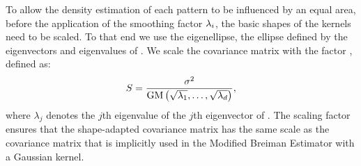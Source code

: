 	To allow the density estimation of each pattern to be influenced by an equal area, before the application of the smoothing factor $\lambda_{i}$, the basic shapes of the kernels need to be scaled. To that end we use the eigenellipse, the ellipse defined by the eigenvectors and eigenvalues of \varCovarianceFunction{\varNeighborhood{\varPattern}}. We scale the covariance matrix with the factor \varScalingFactor, defined as:
	\begin{equation}
		S = \frac{\sigma^2}{\text{GM}\left(\sqrt{\lambda_1}, \dotsc, \sqrt{\lambda_d}\right)},
	\end{equation}
	where $\lambda_j$ denotes the $j$th eigenvalue of the $j$th eigenvector of \varCovarianceMatrix. The scaling factor \varScalingFactor ensures that the shape-adapted covariance matrix has the same scale as the covariance matrix that is implicitly used in the Modified Breiman Estimator with a Gaussian kernel.